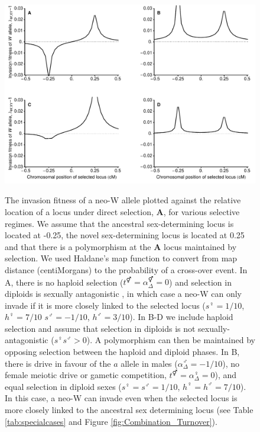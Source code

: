 \documentclass[12pt]{article}
\begin{document}
\begin{figure}[!h]
\centering
\includegraphics[width=\linewidth]{Combination_Centimorgan}\\
\caption{
The invasion fitness of a neo-W allele plotted against the relative location of a locus under direct selection, \textbf{A}, for various selective regimes. 
We assume that the ancestral sex-determining locus is located at -0.25, the novel sex-determining locus is located at 0.25 and that there is a polymorphism at the \textbf{A} locus maintained by selection.
We used Haldane's map function \citep[Equation 3 in ][]{Haldane1919} to convert from map distance (centiMorgans) to the probability of a cross-over event. 
In A, there is no haploid selection ($t^\Hermaphrodite=\alpha^\Hermaphrodite_{\Delta}=0$) and selection in diploids is sexually antagonistic \citep[following][]{vanDoorn:2010hu}, in which case a neo-W can only invade if it is more closely linked to the selected locus ($s^\female=1/10$, $h^\female=7/10$ $s^\male=-1/10$, $h^\male=3/10$).
In B-D we include haploid selection and assume that selection in diploids is not sexually-antagonistic ($s^\female s^\male>0$). 
A polymorphism can then be maintained by opposing selection between the haploid and diploid phases. 
In B, there is drive in favour of the $a$ allele in males ($\alpha^\male_{\Delta}=-1/10$), no female meiotic drive or gametic competition, $t^\Hermaphrodite=\alpha^\female_{\Delta}=0$), and equal selection in diploid sexes ($s^\female=s^\male=1/10$, $h^\female=h^\male=7/10$). In this case, a neo-W can invade even when the selected locus is more closely linked to the ancestral sex determining locus (see Table \ref{tab:specialcases} and Figure \ref{fig:Combination_Turnover}). 
}
\end{figure}
\end{document}
